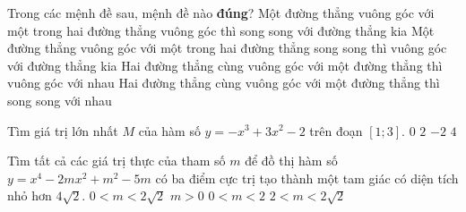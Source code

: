 \begin{ex}%
Trong các mệnh đề sau, mệnh đề nào \textbf{đúng}?
\choice
{Một đường thẳng vuông góc với một trong hai đường thẳng vuông góc thì song song với đường thẳng kia}
{\True Một đường thẳng vuông góc với một trong hai đường thẳng song song thì vuông góc với đường thẳng kia}
{Hai đường thẳng cùng vuông góc với một đường thẳng thì vuông góc với nhau}
{Hai đường thẳng cùng vuông góc với một đường thẳng thì song song với nhau}
\loigiai{

}
\end{ex}


\begin{ex}%
Tìm giá trị lớn nhất $M$ của hàm số $y=-x^{3}+3x^{2}-2$ trên đoạn $\left[1;3\right]$.
\choice
{$0$}
{\True $2$}
{$-2$}
{$4$}
\end{ex}


\begin{ex}%
Tìm tất cả các giá trị thực của tham số $m$ để đồ thị hàm số $y=x^{4}-2mx^{2}+m^{2}-5m$ có ba điểm cực trị
tạo thành một tam giác có diện tích nhỏ hơn $4\sqrt{2}$.
\choice
{$0<m<2\sqrt{2}$}
{$m>0$}
{\True $0<m<2$}
{$2<m<2\sqrt{2}$}
\end{ex}


